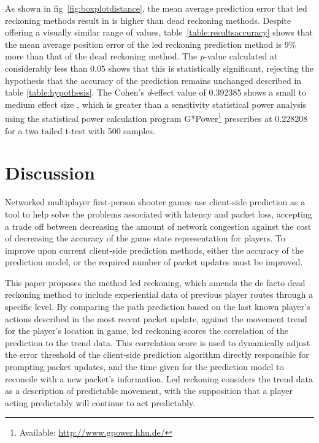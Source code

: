 \documentclass[journal]{IEEEtran}
\begin{document}
As shown in fig~\ref{fig:boxplotdistance}, the mean average prediction error that led reckoning methods result in is higher than dead reckoning methods. Despite offering a visually similar range of values, table~\ref{table:resultsaccuracy} shows that the mean average position error of the led reckoning prediction method is 9\% more than that of the dead reckoning method. The \textit{p}-value calculated at considerably less than 0.05 shows that this is statistically significant, rejecting the hypothesis that the accuracy of the prediction remains unchanged described in table \ref{table:hypothesis}. The Cohen's \textit{d}-effect value of 0.392385 shows a small to medium effect size \cite{cohen2013statistical}, which is greater than a sensitivity statistical power analysis using the statistical power calculation program G*Power\footnote[8]{Available: \url{http://www.gpower.hhu.de/}} prescribes at 0.228208 for a two tailed t-test with 500 samples.

\section{Discussion} \label{resultsdiscussion}

Networked multiplayer first-person shooter games use client-side prediction as a tool to help solve the problems associated with latency and packet loss, accepting a trade off between decreasing the amount of network congestion against the cost of decreasing the accuracy of the game state representation for players. To improve upon current client-side prediction methods, either the accuracy of the prediction model, or the required number of packet updates must be improved.

This paper proposes the method led reckoning, which amends the de facto dead reckoning method to include experiential data of previous player routes through a specific level. By comparing the path prediction based on the last known player's actions described in the most recent packet update, against the movement trend for the player's location in game, led reckoning scores the correlation of the prediction to the trend data. This correlation score is used to dynamically adjust the error threshold of the client-side prediction algorithm directly responsible for prompting packet updates, and the time given for the prediction model to reconcile with a new packet's information. Led reckoning considers the trend data as a description of predictable movement, with the supposition that a player acting predictably will continue to act predictably.
\end{document}

